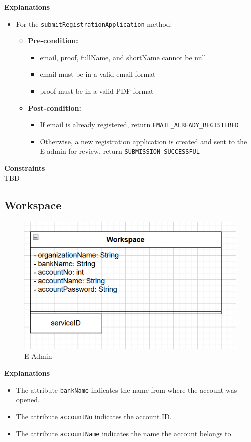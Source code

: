 \textbf{Explanations}
\begin{itemize}
    \item For the \texttt{submitRegistrationApplication} method:
    \begin{itemize}
        \item \textbf{Pre-condition:}
        \begin{itemize}
            \item email, proof, fullName, and shortName cannot be null
            \item email must be in a valid email format
            \item proof must be in a valid PDF format
        \end{itemize}
        \item \textbf{Post-condition:}
        \begin{itemize}
            \item If email is already registered, return \texttt{EMAIL\_ALREADY\_REGISTERED}
            \item Otherwise, a new registration application is created and sent to the E-admin for review, return \texttt{SUBMISSION\_SUCCESSFUL}
        \end{itemize}
    \end{itemize}
\end{itemize}

\textbf{Constraints} \\
TBD

\subsection{Workspace}
\begin{figure}[H]
    \centering
    \includegraphics[width=0.7\linewidth]{picture/3-2/3-2-5.png}
    \caption{E-Admin}
    \label{fig:enter-label}
\end{figure}

\textbf{Explanations}
\begin{itemize}
    \item The attribute \texttt{bankName} indicates the name from where the account was opened.
    \item The attribute \texttt{accountNo} indicates the account ID.
    \item The attribute \texttt{accountName} indicates the name the account belongs to.
\end{itemize}

